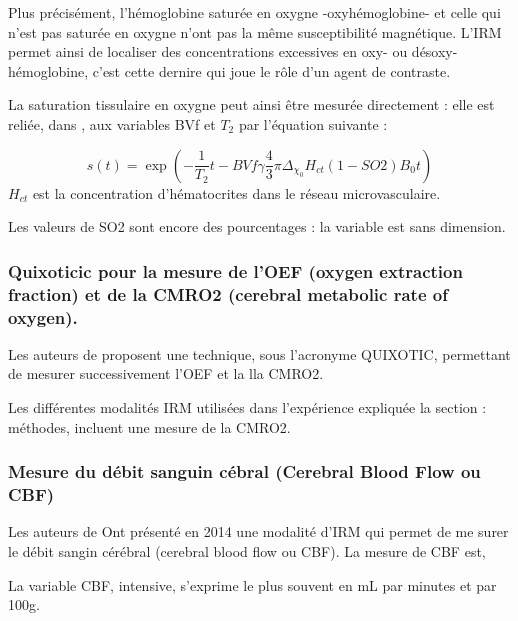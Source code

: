 \par
Plus pr\'ecis\'ement, l'h\'emoglobine satur\'ee en oxygne -oxyh\'emoglobine- et celle qui n'est pas satur\'ee en oxygne n'ont pas la m\^eme susceptibilit\'e magn\'etique. %
L'IRM permet ainsi de localiser des concentrations excessives en oxy- ou d\'esoxy-h\'emoglobine, %
c'est cette dernire qui joue le r\^ole d'un agent de contraste.

\par
La saturation tissulaire en oxygne peut ainsi \^etre mesur\'ee directement : %
elle est reli\'ee, dans \cite{christen2012l}, aux variables BVf et $T_2$ par l'\'equation suivante :

\begin{equation}
s(t)=\exp\left(-\frac{1}{T_2}t-BVf\gamma\frac{4}{3}\pi\Delta_{\chi_0}H_{ct}(1-SO2)B_0t\right)
\label{bold_so2}
\end{equation}
$H_{ct}$ est la concentration d'h\'ematocrites dans le r\'eseau microvasculaire.

\par
Les valeurs de SO2 sont encore des pourcentages : la variable est sans dimension.

\subsubsection{Quixoticic pour la mesure de l'OEF (oxygen extraction fraction) %
et de la CMRO2 (cerebral metabolic rate of oxygen).}

Les auteurs de \cite{quixotic} proposent une technique, sous l'acronyme QUIXOTIC, permettant de mesurer successivement l'OEF et la lla CMRO2.

\par
Les diff\'erentes modalit\'es IRM utilis\'ees dans l'exp\'erience expliqu\'ee  la section : m\'ethodes, %
incluent une mesure de la CMRO2.

\subsubsection{Mesure du d\'ebit sanguin c\'ebral (Cerebral Blood Flow ou CBF)}

Les auteurs de \cite{cbf_alz} Ont pr\'esent\'e en 2014 une modalit\'e d'IRM qui permet de me surer le d\'ebit sangin c\'er\'ebral (cerebral blood flow ou CBF). %
La mesure de CBF est, 

\par
La variable CBF, intensive, s'exprime le plus souvent en mL par minutes et par 100g.


